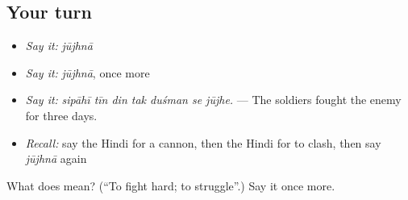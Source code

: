 \subsection*{Your turn}
\begin{itemize}
\raggedright
  \item \emph{Say it:} \emph{jūjhnā}
  \item \emph{Say it:} \emph{jūjhnā}, once more
  \item \emph{Say it:} \emph{sipāhī tīn din tak duśman se jūjhe.} — The soldiers fought the enemy for three days.
  \item \emph{Recall:} say the Hindi for a cannon, then the Hindi for to clash, then say \emph{jūjhnā} again
\end{itemize}

\begin{tcolorbox}[breakable,colback=teal!4,colframe=teal!35!black,title={Before you move on}]
What does  mean? (\textquotedblleft{}To fight hard; to struggle\textquotedblright{}.) Say it once more.
\end{tcolorbox}
